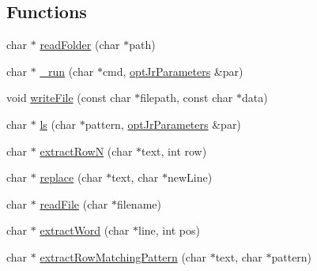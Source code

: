 \subsection*{Functions}
\begin{DoxyCompactItemize}
\item 
char $\ast$ \hyperlink{invokePredictor__helper_8hh_a28d1d79b02f44f349115bf4c9e754770}{read\-Folder} (char $\ast$path)
\item 
char $\ast$ \hyperlink{invokePredictor__helper_8hh_a0f49de720b1b8bcb143e37e9e8a5ab39}{\-\_\-run} (char $\ast$cmd, \hyperlink{classoptJrParameters}{opt\-Jr\-Parameters} \&par)
\item 
void \hyperlink{invokePredictor__helper_8hh_a7eb7b34e9ea84bfbed4afbf5f63dd024}{write\-File} (const char $\ast$filepath, const char $\ast$data)
\item 
char $\ast$ \hyperlink{invokePredictor__helper_8hh_ab01a14d4a3e7b93f83060c8664c3bc42}{ls} (char $\ast$pattern, \hyperlink{classoptJrParameters}{opt\-Jr\-Parameters} \&par)
\item 
char $\ast$ \hyperlink{invokePredictor__helper_8hh_af8e06c5020e70e2f740101fc7bed6fea}{extract\-Row\-N} (char $\ast$text, int row)
\item 
char $\ast$ \hyperlink{invokePredictor__helper_8hh_a66e21ca5b85d790af9025eb13f4beca5}{replace} (char $\ast$text, char $\ast$new\-Line)
\item 
char $\ast$ \hyperlink{invokePredictor__helper_8hh_aec83b878d49ef5976f2175867cdc2d82}{read\-File} (char $\ast$filename)
\item 
char $\ast$ \hyperlink{invokePredictor__helper_8hh_af6244416f7b414764278d2f5cdfe262c}{extract\-Word} (char $\ast$line, int pos)
\item 
char $\ast$ \hyperlink{invokePredictor__helper_8hh_abf4e66cc6aa015a35688c049d4f72ade}{extract\-Row\-Matching\-Pattern} (char $\ast$text, char $\ast$pattern)
\end{DoxyCompactItemize}


